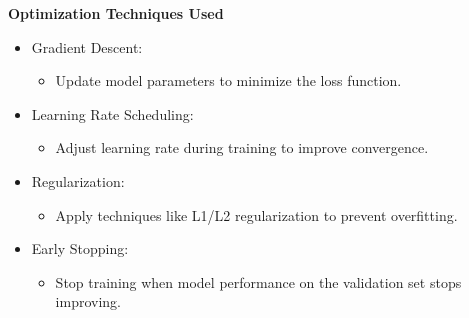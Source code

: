 \begin{frame}
	
	\textbf{Optimization Techniques Used}
	\begin{itemize}
		\item Gradient Descent:
		\begin{itemize}
			\item Update model parameters to minimize the loss function.
		\end{itemize}
		
		\item Learning Rate Scheduling:
		\begin{itemize}
			\item Adjust learning rate during training to improve convergence.
		\end{itemize}
		
		\item Regularization:
		\begin{itemize}
			\item Apply techniques like L1/L2 regularization to prevent overfitting.
		\end{itemize}
		
		\item Early Stopping:
		\begin{itemize}
			\item Stop training when model performance on the validation set stops improving.
		\end{itemize}
	\end{itemize}	
\end{frame}

